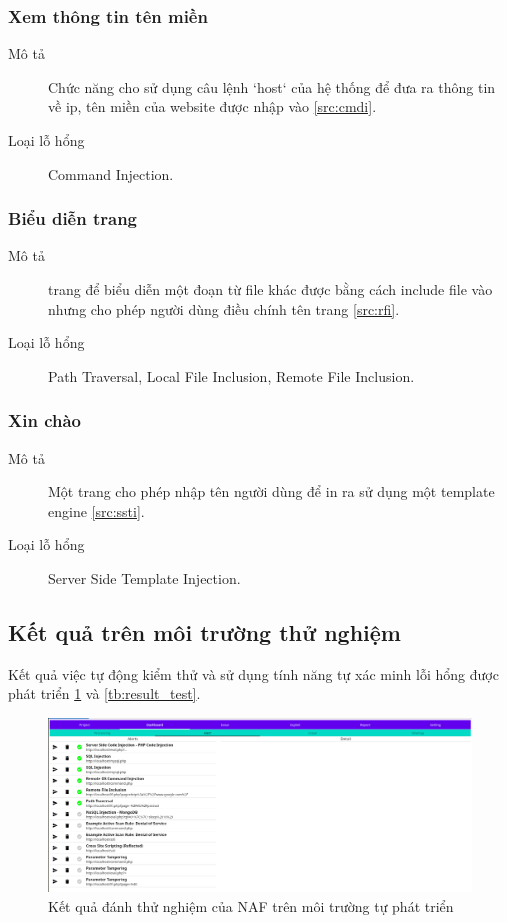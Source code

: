 \documentclass[./../main.tex]{subfiles}
\begin{document}
\subsubsection{Xem thông tin tên miền}

\begin{description}
	\item[Mô tả] Chức năng cho sử dụng câu lệnh `host` của hệ thống để đưa ra thông tin về ip, tên miền của website được nhập vào \ref{src:cmdi}.
	\item[Loại lỗ hổng] Command Injection.
\end{description}

\subsubsection{Biểu diễn trang}

\begin{description}
	\item[Mô tả] trang để biểu diễn một đoạn từ file khác được bằng cách
	      include file vào nhưng cho phép người dùng điều chính tên trang \ref{src:rfi}.
	\item[Loại lỗ hổng] Path Traversal, Local File Inclusion, Remote
	      File Inclusion.
\end{description}

\subsubsection{Xin chào}

\begin{description}
	\item[Mô tả] Một trang cho phép nhập tên người dùng để in ra sử dụng một template engine \ref{src:ssti}.
	\item[Loại lỗ hổng] Server Side Template Injection.
\end{description}


\subsection{Kết quả trên môi trường thử nghiệm}

Kết quả việc tự động kiểm thử và sử dụng tính năng tự xác minh lỗi
hổng được phát triển \ref{fig:result_test} và \ref{tb:result_test}.

\begin{figure}[h!]
	\includegraphics[width=\linewidth]{./images/naf_result.png}
	\caption{Kết quả đánh thử nghiệm của NAF trên môi trường tự phát triển}
	\label{fig:result_test}
\end{figure}
\end{document}

